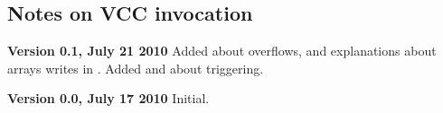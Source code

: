 \subsection{Notes on VCC invocation}
\label{sect:todo-invoke}



\noindent \textbf{Version 0.1, July 21 2010}
Added  about overflows, and explanations about arrays writes in .
Added  and  about triggering.

\noindent \textbf{Version 0.0, July 17 2010}
Initial.

% 
%
